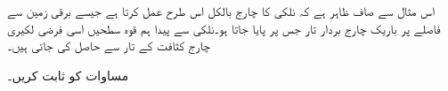 
اس مثال سے صاف ظاہر ہے کہ نلکی کا چارج بالکل اس طرح عمل کرتا ہے جیسے برقی زمین سے   فاصلے پر باریک چارج بردار تار جس پر   پایا جاتا ہو۔نلکی سے پیدا ہم قوہ سطحیں اسی فرضی لکیری چارج کثافت کے تار سے حاصل کی جاتی ہیں۔

مساوات  کو ثابت کریں۔


